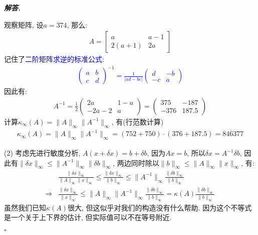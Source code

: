 \documentclass[10pt, a4paper, oneside]{ctexart}
\newcommand{\norm}[1]{\| #1 \|}
\newenvironment{solution}{%
  \par\noindent\textbf{\textit{解答. }}\ignorespaces
}{%
  \hfill\ensuremath{\square}\par %
}
\begin{document}
\begin{solution}
观察矩阵, 设$a=374$, 那么:
\begin{align*}
    A = \begin{bmatrix}
        a&a-1\\
        2(a+1)&2a
    \end{bmatrix}
\end{align*}
记住了\textcolor{blue}{二阶矩阵求逆的标准公式:
\begin{align*}
    \begin{pmatrix}
        a&b\\c&d
    \end{pmatrix}^{-1}=\frac{1}{|ad-bc|}\begin{pmatrix}
        d&-b \\-c &a
    \end{pmatrix}
\end{align*}}
因此有:
\begin{align*}
    A^{-1}=\frac{1}{2}\begin{pmatrix}
        2a&1-a\\-2a-2&a
    \end{pmatrix}=\begin{pmatrix}
        375&-187\\-376&187.5
    \end{pmatrix}
\end{align*}
计算$\kappa_{\infty}(A)=\norm{A}_{\infty}\norm{A^{-1}}_{\infty}$, 有(行范数计算)
\begin{align*}
    \kappa_{\infty}(A)=\norm{A}_{\infty}\norm{A^{-1}}_{\infty}=(752+750)\cdot(376+187.5)= 846377
\end{align*}

(2) 考虑先进行敏度分析, $A(x+\delta x)=b+\delta b$, 因为$Ax=b$, 所以$\delta x=A^{-1}\delta b$, 因此有$\norm{\delta x}_{\infty}\leq \norm{A^{-1}}_{\infty}\norm{\delta b}_{\infty}$, 两边同时除以$\norm{b}_{\infty}\leq \norm{A}_{\infty}\norm{x}_{\infty}$, 有:
\begin{align*}
    &\frac{\norm{\delta x}_{\infty}}{\norm{A}_{\infty}\norm{x}_{\infty}} \leq \frac{\norm{\delta x}_{\infty}}{\norm{b}_{\infty}}\leq \norm{A^{-1}}_{\infty}\frac{\norm{\delta b}_{\infty}}{\norm{b}_{\infty}}\\
    \Rightarrow& \frac{\norm{\delta x}_{\infty}}{\norm{x}_{\infty}} \leq \norm{A}_{\infty}\norm{A^{-1}}_{\infty}\frac{\norm{\delta b}_{\infty}}{\norm{b}_{\infty}}=\kappa(A)\frac{\norm{\delta b}_{\infty}}{\norm{b}_{\infty}}
\end{align*}
虽然我们已知$\kappa(A)$很大, 但这似乎对我们的构造没有什么帮助. 因为这个不等式是一个关于上下界的估计, 但实际值可以不在等号附近.


\end{solution}
\end{document}
